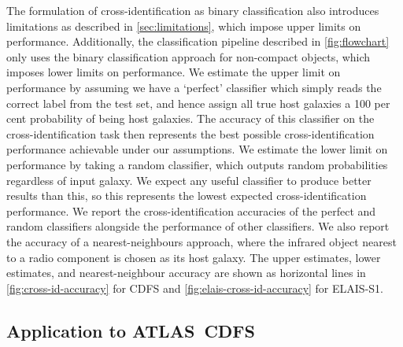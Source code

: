\documentclass[fleqn,usenatbib,usedcolumn]{mnras}
\begin{document}
    The formulation of cross-identification as binary classification also
    introduces limitations as described in \autoref{sec:limitations}, which
    impose upper limits on performance. Additionally, the classification
    pipeline described in \autoref{fig:flowchart} only uses the binary
    classification approach for non-compact objects, which imposes lower
    limits on performance. We estimate the upper limit on performance by
    assuming we have a `perfect' classifier which simply reads the correct
    label from the test set, and hence assign all true host galaxies a 100 per
    cent probability of being host galaxies. The accuracy of this
    classifier on the cross-identification task then represents the best
    possible cross-identification performance achievable under our
    assumptions. We estimate the lower limit on performance by taking a random
    classifier, which outputs random probabilities regardless of input galaxy.
    We expect any useful classifier to produce better results than this, so this
    represents the lowest expected cross-identification performance. We report
    the cross-identification accuracies of the perfect and random classifiers
    alongside the performance of other classifiers. We also report the accuracy of a nearest-neighbours approach, where the infrared object nearest to a radio component is chosen as its host galaxy. The upper estimates, lower estimates, and nearest-neighbour accuracy are shown as horizontal lines in \autoref{fig:cross-id-accuracy}
    for CDFS and \autoref{fig:elais-cross-id-accuracy} for ELAIS-S1.

  \subsection{Application to ATLAS~CDFS}
\end{document}

